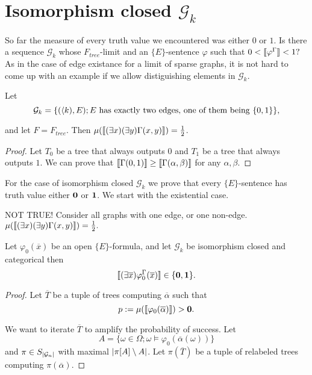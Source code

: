 \section{Isomorphism closed $\mathcal{G}_k$}

So far the measure of every truth value we encountered was either $0$ or $1$. Is there a sequence $\mathcal{G}_k$ whose $F_{tree}$-limit and an $\{E\}$-sentence $\varphi$ such that ${0<\llbracket\varphi^\Gamma\rrbracket<1?}$ As in the case of edge existance for a limit of sparse graphs, it is not hard to come up with an example if we allow distiguishing elements in $\mathcal{G}_k$.

\begin{exam}
Let \[\mathcal{G}_k=\{(\langle k),E);\text{$E$ has exactly two edges, one of them being $\{0,1\}$}\},\]

and let $F=F_{tree}$. Then $\mu(\llbracket(\exists x)(\exists y)\Gamma(x,y)\rrbracket)=\frac{1}{2}$.
\end{exam}
\begin{proof}
Let $T_0$ be a tree that always outputs $0$ and $T_1$ be a tree that always outputs $1$. We can prove that $\llbracket\Gamma(0,1)\rrbracket\geq\llbracket\Gamma(\alpha,\beta)\rrbracket$ for any $\alpha,\beta$. 
\end{proof}

For the case of isomorphism closed $\mathcal{G}_k$ we prove that every $\{E\}$-sentence has truth value either $\textbf{0}$ or $\textbf{1}$. We start with the existential case.

\begin{exam}
NOT TRUE! Consider all graphs with one edge, or one non-edge. $\mu(\llbracket(\exists x)(\exists y)\Gamma(x,y)\rrbracket)=\frac{1}{2}.$
\end{exam}

\begin{thrm}
Let $\varphi_0(\overline x)$ be an open $\{E\}$-formula, and let $\mathcal{G}_k$ be isomorphism closed and categorical then
\[\llbracket(\exists \overline x)\varphi_0^\Gamma(\overline x)\rrbracket\in\{\textbf{0},\textbf{1}\}.\]
\end{thrm}

\begin{proof}
Let $\overline T$ be a tuple of trees computing $\overline \alpha$ such that 
\[p:=\mu(\llbracket\varphi_0(\overline \alpha)\rrbracket)>\textbf{0}.\]

We want to iterate $\overline T$ to amplify the probability of success. Let 
\[A=\{\omega \in \Omega; \omega \models \varphi_0(\overline\alpha(\omega)) \}\]
and $\pi\in S_{\left|{\mathcal{G}_n}\right|}$ with maximal $\left|{\pi[A]\setminus A}\right|$. Let $\pi(\overline T)$ be a tuple of relabeled trees computing $\pi(\overline \alpha)$.
\end{proof}
